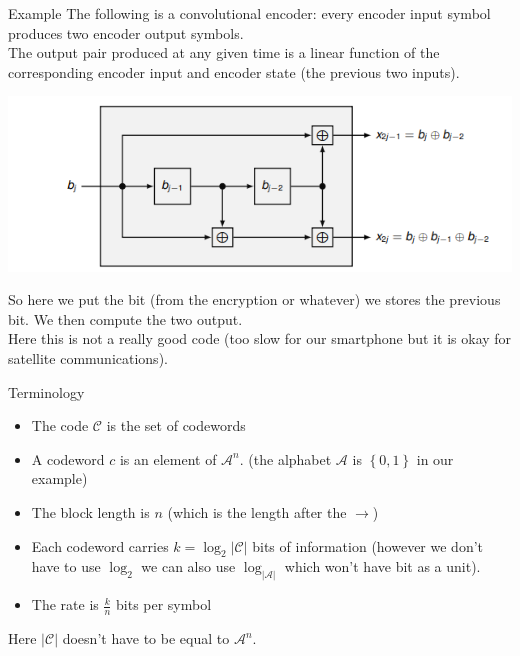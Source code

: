 \begin{parag}{Example}
    The following is a convolutional encoder: every encoder input symbol produces two encoder output symbols.\\
    The output pair produced at any given time is a linear function of the corresponding encoder input and encoder state (the previous two inputs).
    \begin{center}
        \includegraphics[scale=0.9]{42025-04-29.png}
    \end{center}
        So here we put the bit (from the encryption or whatever) we stores the previous bit. We then compute the two output.\\
        Here this is not a really good code (too slow for our smartphone but it is okay for satellite communications).

    
\end{parag}
\begin{parag}{Terminology}
    \begin{itemize}
        \item The code $\mathcal{C}$ is the set of codewords 
        \item A codeword $c$ is an element of $\mathcal{A}^n$. (the alphabet $\mathcal{A}$ is $\left\{0, 1\right\}$ in our example)
        \item The block length is $n$  (which is the length after the $\to$)
        \item Each codeword carries $k = \log_2\left|\mathcal{C}\right|$ bits of information (however we don't have to use $\log_2$ we can also use $\log_{\left|\mathcal{A}\right|}$ which won't have bit as a unit).
        \item The rate is $\frac{k}{n}$ bits per symbol
    \end{itemize}
    
   \begin{framedremark}
       Here $\left|\mathcal{C}\right|$ doesn't have to be equal to $\mathcal{A}^n$.
   \end{framedremark}
    
\end{parag}
